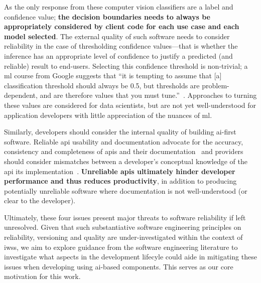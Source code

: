 As the only response from these computer vision classifiers are a label and confidence value; \textbf{the decision boundaries needs to always be appropriately considered by client code for each use case and each model selected}. 
The external quality of such software needs to consider reliability in the case of thresholding confidence values---that is whether the inference has an appropriate level of confidence to justify a predicted (and reliable) result to end-users. Selecting this confidence threshold is non-trivial; a \gls{ml} course from Google suggests that ``it is tempting to assume that [a] classification threshold should always be 0.5, but thresholds are problem-dependent, and are therefore values that you must tune.''~\citep{Classifi7:online}. 
Approaches to turning these values are considered for data scientists, but are not yet well-understood for application developers with little appreciation of the nuances of \gls{ml}. 

Similarly, developers should consider the internal quality of building \gls{ai}-first software. Reliable \gls{api} usability and documentation advocate for the accuracy, consistency and completeness of \glspl{api} and their documentation~\citep{Piccioni:2013em,Robillard:2009uk} and providers should consider mismatches between a developer's conceptual knowledge of the \gls{api} its implementation~\citep{Ko:2011fb}. \textbf{Unreliable \glspl{api} ultimately hinder developer performance and thus reduces productivity}, in addition to producing potentially unreliable software where documentation is not well-understood (or clear to the developer).

Ultimately, these four issues present major threats to software reliability if left unresolved. Given that such substantiative software engineering principles on reliability, versioning and quality  are under-investigated within the context of \glspl{iws}, we aim to explore guidance from the software engineering literature to investigate what aspects in the development lifecyle could aide in mitigating these issues when developing using \gls{ai}-based components. This serves as our core motivation for this work.